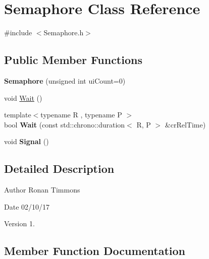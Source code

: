 \hypertarget{classSemaphore}{}\section{Semaphore Class Reference}
\label{classSemaphore}


{\ttfamily \#include $<$Semaphore.\+h$>$}

\subsection*{Public Member Functions}
\begin{DoxyCompactItemize}
\item 
{\bfseries Semaphore} (unsigned int ui\+Count=0)\hypertarget{classSemaphore_a0d9290d316636875ca85d1d78950a817}{}\label{classSemaphore_a0d9290d316636875ca85d1d78950a817}

\item 
void \hyperlink{classSemaphore_a72aabebf026e3a8b1f3e4d0fa8ee1eda}{Wait} ()
\item 
{\footnotesize template$<$typename R , typename P $>$ }\\bool {\bfseries Wait} (const std\+::chrono\+::duration$<$ R, P $>$ \&cr\+Rel\+Time)\hypertarget{classSemaphore_a7f700173ae86ae623684109066e07656}{}\label{classSemaphore_a7f700173ae86ae623684109066e07656}

\item 
void {\bfseries Signal} ()\hypertarget{classSemaphore_a86f92f738b4486439b296d8e235895f2}{}\label{classSemaphore_a86f92f738b4486439b296d8e235895f2}

\end{DoxyCompactItemize}


\subsection{Detailed Description}
\begin{DoxyAuthor}{Author}
Ronan Timmons 
\end{DoxyAuthor}
\begin{DoxyDate}{Date}
02/10/17 
\end{DoxyDate}
\begin{DoxyVersion}{Version}
1. 
\end{DoxyVersion}


\subsection{Member Function Documentation}
